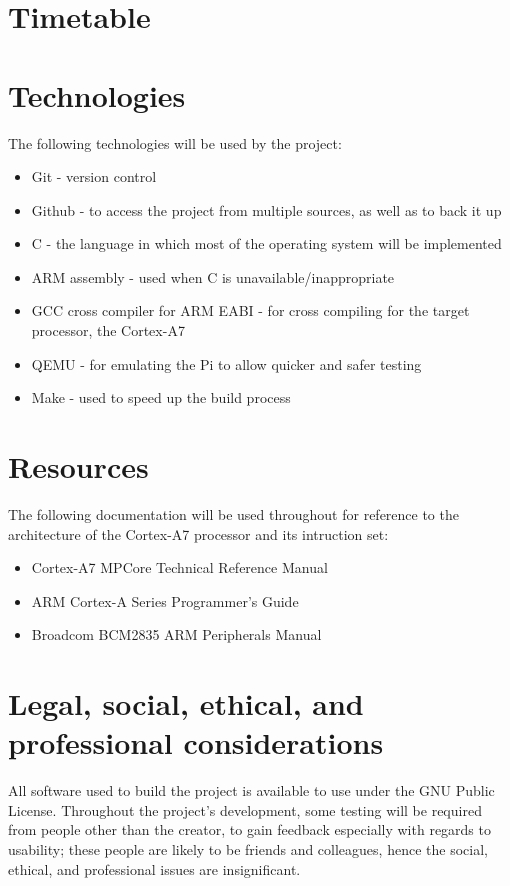 \documentclass[10pt,a4paper]{article}
\begin{document}
\section*{Timetable}

\section*{Technologies}
The following technologies will be used by the project:
\begin{itemize}
    \item Git - version control
    \item Github - to access the project from multiple sources, as well as to
        back it up
    \item C - the language in which most of the operating system will be
        implemented
    \item ARM assembly - used when C is unavailable/inappropriate
        \cite{CannotDoC}
    \item GCC cross compiler for ARM EABI - for cross compiling for the target
        processor, the Cortex-A7 \cite{CrossCompilation}
    \item QEMU - for emulating the Pi to allow quicker and safer testing
        \cite{qemu}
    \item Make - used to speed up the build process
\end{itemize}

\section*{Resources}
The following documentation will be used throughout for reference to the
architecture of the Cortex-A7 processor and its intruction set:
        \begin{itemize}
            \item Cortex-A7 MPCore Technical Reference Manual
            \item ARM Cortex-A Series Programmer's Guide
            \item Broadcom BCM2835 ARM Peripherals Manual
        \end{itemize}

\section*{Legal, social, ethical, and professional  considerations}
All software used to build the project is available to use under the GNU Public
License. Throughout the project's development, some testing will be required
from people other than the creator, to gain feedback especially with regards to
usability; these people are likely to be friends and colleagues, hence the
social, ethical, and professional issues are insignificant.


\end{document}
